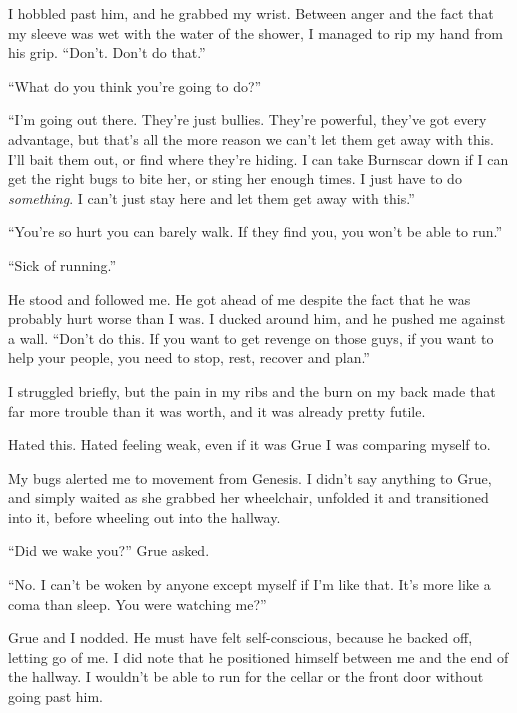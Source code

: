 I hobbled past him, and he grabbed my wrist.  Between anger and the fact that my sleeve was wet with the water of the shower, I managed to rip my hand from his grip.  ``Don't.  Don't do that.''



``What do you think you're going to do?''



``I'm going out there.  They're just bullies.  They're powerful, they've got every advantage, but that's all the more reason we can't let them get away with this.  I'll bait them out, or find where they're hiding.  I can take Burnscar down if I can get the right bugs to bite her, or sting her enough times.  I just have to do \emph{something}.  I can't just stay here and let them get away with this.''



``You're so hurt you can barely walk.  If they find you, you won't be able to run.''



``Sick of running.''



He stood and followed me.  He got ahead of me despite the fact that he was probably hurt worse than I was.  I ducked around him, and he pushed me against a wall.  ``Don't do this.  If you want to get revenge on those guys, if you want to help your people, you need to stop, rest, recover and plan.''



I struggled briefly, but the pain in my ribs and the burn on my back made that far more trouble than it was worth, and it was already pretty futile.



Hated this.  Hated feeling weak, even if it was Grue I was comparing myself to.



My bugs alerted me to movement from Genesis.  I didn't say anything to Grue, and simply waited as she grabbed her wheelchair, unfolded it and transitioned into it, before wheeling out into the hallway.



``Did we wake you?'' Grue asked.



``No.  I can't be woken by anyone except myself if I'm like that.  It's more like a coma than sleep.  You were watching me?''



Grue and I nodded.  He must have felt self-conscious, because he backed off, letting go of me.  I did note that he positioned himself between me and the end of the hallway.  I wouldn't be able to run for the cellar or the front door without going past him.



